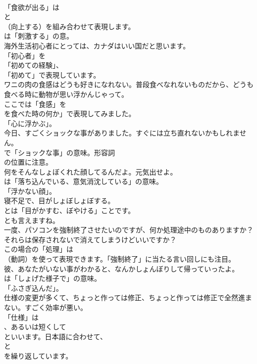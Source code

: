 \documentclass[8pt]{extreport}
\begin{document}
\begin{CJK}{UTF8}{min}
\\	「食欲が出る」は 
\\	と 
\\	（向上する）を組み合わせて表現します。
\\	は「刺激する」の意。	
\\	海外生活初心者にとっては、カナダはいい国だと思います。 
\\	「初心者」を
\\	「初めての経験」、
\\	「初めて」で表現しています。	
\\	ワニの肉の食感はどうも好きになれない。普段食べなれないものだから、どうも食べる時に動物が思い浮かんじゃって。 
\\	ここでは「食感」を
\\	を食べた時の何か」で表現してみました。
\\	「心に浮かぶ」。	
\\	今日、すごくショックな事がありました。すぐには立ち直れないかもしれません。 
\\	で「ショックな事」の意味。形容詞 
\\	の位置に注意。	
\\	何をそんなしょぼくれた顔してるんだよ。元気出せよ。 
\\	は「落ち込んでいる、意気消沈している」の意味。
\\	「浮かない顔」。	
\\	寝不足で、目がしょぼしょぼする。 
\\	とは「目がかすむ、ぼやける」ことです。
\\	とも言えますね。	
\\	一度、パソコンを強制終了させたいのですが、何か処理途中のものありますか？ それらは保存されないで消えてしまうけどいいですか？ 
\\	この場合の「処理」は
\\	（動詞）を使って表現できます。「強制終了」に当たる言い回しにも注目。	
\\	彼、あなたがいない事がわかると、なんかしょんぼりして帰っていったよ。 
\\	は「しょげた様子で」の意味。
\\	「ふさぎ込んだ」。	
\\	仕様の変更が多くて、ちょっと作っては修正、ちょっと作っては修正で全然進まない。すごく効率が悪い。 
\\	「仕様」は
\\	、あるいは短くして
\\	といいます。日本語に合わせて、
\\	と
\\	を繰り返しています。	

\end{CJK}
\end{document}
